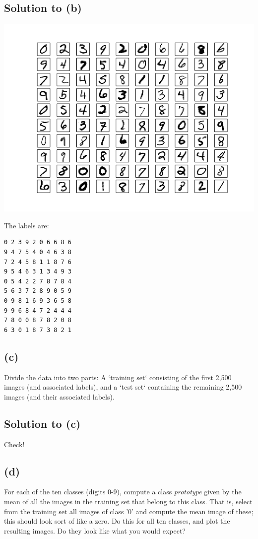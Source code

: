 \documentclass[10pt]{article}
\begin{document}
\subsection*{Solution to (b)}
\begin{center}
\includegraphics[scale=0.5]{100TestMnistImages}
\end{center}
The labels are:
\begin{center}
\begin{verbatim}
0 2 3 9 2 0 6 6 8 6 
9 4 7 5 4 0 4 6 3 8 
7 2 4 5 8 1 1 8 7 6 
9 5 4 6 3 1 3 4 9 3 
0 5 4 2 2 7 8 7 8 4 
5 6 3 7 2 8 9 0 5 9 
0 9 8 1 6 9 3 6 5 8 
9 9 6 8 4 7 2 4 4 4 
7 8 0 0 8 7 8 2 0 8 
6 3 0 1 8 7 3 8 2 1
\end{verbatim}
\end{center}

\subsection*{(c)}
\color{blue}
Divide the data into two parts: A `training set` consisting of the first 2,500 images (and associated labels), and a `test set` containing the remaining 2,500 images (and their associated labels).
\color{black}

\subsection*{Solution to (c)}
Check!

\subsection*{(d)}
\color{blue}
For each of the ten classes (digits 0-9), compute a class \textit{prototype} given by the mean of all the images in the training set that belong to this class. That is, select from the training set all images of class '0' and compute the mean image of these; this should look sort of like a zero. Do this for all ten classes, and plot the resulting images. Do they look like what you would expect?
\color{black}
\end{document}
